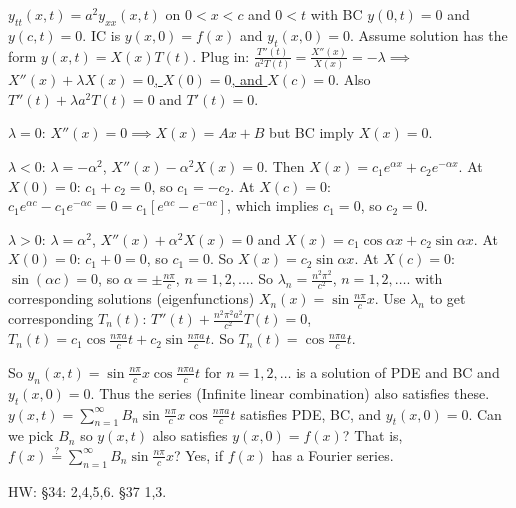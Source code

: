 \documentclass[]{article}
\begin{document}
\begin{example}
	 $y_{tt}(x,t) = a^2 y_{xx}(x,t)$ on $0<x<c$ and $0<t$ with BC $y(0,t)=0$ and $y(c,t)=0$. IC is $y(x,0)=f(x)$ and $y_t(x,0)=0$.
	Assume solution has the form $y(x,t)=X(x)T(t)$. Plug in: $\frac{T''(t)}{a^2T(t)}=\frac{X''(x)}{X(x)} = -\lambda \implies$\underline{$X''(x)+\lambda X(x)=0$, $X(0)=0$, and $X(c)=0$}. Also $T''(t)+\lambda a^2 T(t)=0$ and $T'(t)=0$.

	\underline{$\lambda=0$}: $X''(x)=0 \implies X(x)=Ax+B$ but BC imply $X(x)=0$.

	\underline{$\lambda<0$}: $\lambda=-\alpha^2$, $X''(x)-\alpha^2 X(x)=0$. Then $X(x) = c_1e^{\alpha x} + c_2 e^{-\alpha x}$. At $X(0)=0$: $c_1+c_2=0$, so $c_1=-c_2$. At $X(c)=0$: $c_1e^{\alpha c} - c_1e^{-\alpha c} = 0 = c_1 \left[ e^{\alpha c} - e^{-\alpha c}\right]$, which implies $c_1 = 0$, so $c_2=0$.

	\underline{$\lambda>0$}: $\lambda = \alpha^2$, $X''(x) + \alpha^2 X(x) = 0$ and $X(x) = c_1 \cos{\alpha x} + c_2 \sin{\alpha x}$. At $X(0)=0$: $c_1+0=0$, so $c_1=0$. So $X(x) = c_2\sin{\alpha x}$. At $X(c)=0$: $\sin{(\alpha c)} = 0$, so $\alpha = \pm\frac{n\pi}{c}$, $n=1,2,\dots$.
	So $\lambda_n = \frac{n^2\pi^2}{c^2}$, $n=1,2,\dots$. with corresponding solutions (eigenfunctions) $X_n(x) = \sin{\frac{n\pi}{c}x}$.
	Use $\lambda_n$ to get corresponding $T_n(t)$: $T''(t) + \frac{n^2\pi^2a^2}{c^2}T(t) = 0$, $T_n(t) = c_1\cos{\frac{n\pi a}{c}t} + c_2\sin{\frac{n\pi a}{c}t}$. So $T_n(t) = \cos{\frac{n\pi a}{c}t}$.

	So $y_n(x,t) = \sin{\frac{n\pi}{c}x} \cos{\frac{n\pi a}{c} t}$ for $n=1,2,\dots$ is a solution of PDE and BC and $y_t(x,0)=0$.
	Thus the series (Infinite linear combination) also satisfies these.
	$y(x,t) = \sum_{n=1}^\infty B_n \sin{\frac{n\pi}{c}x}\cos{\frac{n\pi a}{c}t}$ satisfies PDE, BC, and $y_t(x,0)=0$.
	Can we pick $B_n$ so $y(x,t)$ also satisfies $y(x,0) = f(x)$?
	That is, $f(x) \stackrel{?}{=} \sum_{n=1}^\infty B_n \sin{\frac{n\pi}{c}x}$?
	Yes, if $f(x)$ has a Fourier series.
\end{example}
HW: \S34: 2,4,5,6. \S37 1,3.
\end{document}
